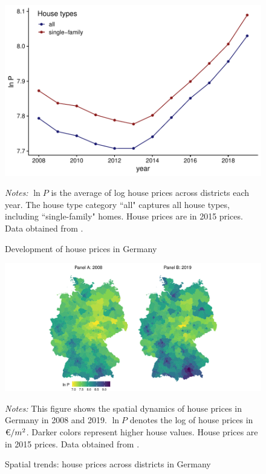 \documentclass[
  12pt,
]{article}
\begin{document}
\begin{figure}[H]
\centering

\begin{center}\includegraphics{output/figs/price-growth-1} \end{center}

\caption{Development of house prices in Germany}\label{fig:price-growth}
\medskip
\begin{minipage}{0.9\textwidth}
\footnotesize
\textit{Notes:} $\ln P$ is the average of log house prices across districts each year. The house type category ``all" captures all house types, including ``single-family" homes. House prices are in 2015 prices. Data obtained from \citet{rwi2020}.
\end{minipage}
\end{figure}

\begin{figure}[h]
\centering

\begin{center}\includegraphics{output/figs/spatial-pattern-1} \end{center}

\caption{Spatial trends: house prices across districts in Germany}\label{fig:spatial-pattern}
\medskip
\begin{minipage}{0.9\textwidth}
\footnotesize
\textit{Notes:} This figure shows the spatial dynamics of house prices in Germany in 2008 and 2019. $\ln P$ denotes the log of house prices in $\text{\texteuro}/m^2$. Darker colors represent higher house values. House prices are in 2015 prices. Data obtained from \citet{rwi2020}.
\end{minipage}
\end{figure}
\end{document}
